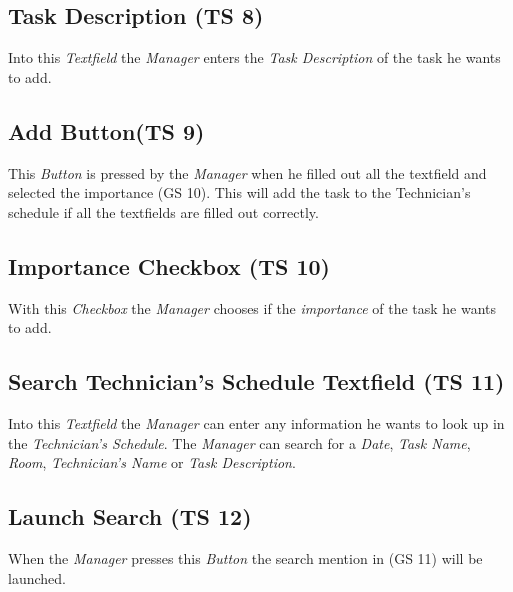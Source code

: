 \subsection{Task Description (TS 8)}
Into this \emph{Textfield} the \emph{Manager} enters the \emph{Task Description}
of the task he wants to add.

\subsection{Add Button(TS 9)}
This \emph{Button} is pressed by the \emph{Manager} when he filled out all
the textfield and selected the importance (GS 10). This will add the task to the
Technician's schedule if all the textfields are filled out correctly.

\subsection{Importance Checkbox (TS 10)}
With this \emph{Checkbox} the \emph{Manager} chooses if the \emph{importance} of
the task he wants to add.

\subsection{Search Technician's Schedule Textfield (TS 11)}
Into this \emph{Textfield} the \emph{Manager} can enter any information he wants
to look up in the \emph{Technician's Schedule}. The \emph{Manager} can search
for a \emph{Date}, \emph{Task Name}, \emph{Room}, \emph{Technician's Name} or
\emph{Task Description}.

\subsection{Launch Search (TS 12)}
When the \emph{Manager} presses this \emph{Button} the search mention in (GS
11) will be launched.

